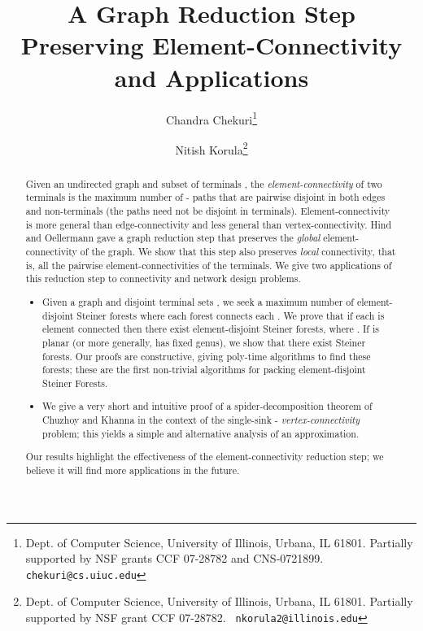 \documentclass[11pt]{article}
\title{A Graph Reduction Step Preserving Element-Connectivity \\ and Applications}
\author{
Chandra Chekuri\thanks{Dept. of Computer Science, University of Illinois, 
Urbana, IL 61801. Partially supported by NSF grants CCF 07-28782 and 
CNS-0721899. {\tt chekuri@cs.uiuc.edu}}
  \and 
Nitish Korula\thanks{Dept. of Computer Science, University of Illinois, Urbana,
    IL 61801. Partially supported by NSF grant CCF 07-28782. {\tt
      nkorula2@illinois.edu}} 
}
\begin{document}
\maketitle

\begin{abstract}
  Given an undirected graph  and subset of terminals , the {\em element-connectivity}  of two
  terminals  is the maximum number of - paths that
  are pairwise disjoint in both edges and non-terminals  (the paths need not be disjoint in terminals).
  Element-connectivity is more general than edge-connectivity and less
  general than vertex-connectivity. Hind and Oellermann \cite{hind}
  gave a graph reduction step that preserves the {\em global}
  element-connectivity of the graph.  We show that this step also
  preserves {\em local} connectivity, that is, all the pairwise
  element-connectivities of the terminals. We give two applications of
  this reduction step to connectivity and network design problems.
  \begin{itemize}
  \item Given a graph  and disjoint terminal sets , we seek a maximum number of element-disjoint
    Steiner forests where each forest connects each . We prove
    that if each  is  element connected then there exist
     element-disjoint Steiner
    forests, where . If  is planar (or more
    generally, has fixed genus), we show that there exist 
    Steiner forests. Our proofs are constructive, giving poly-time
    algorithms to find these forests; these are the first non-trivial
    algorithms for packing element-disjoint Steiner Forests.
  
  \item We give a very short and intuitive proof of a
    spider-decomposition theorem of Chuzhoy and Khanna
    \cite{ChuzhoyK08} in the context of the single-sink -{\em
      vertex-connectivity} problem; this yields a simple and
    alternative analysis of an  approximation.
  \end{itemize}
  Our results highlight the effectiveness of the element-connectivity
  reduction step; we believe it will find more applications in the future.
\end{abstract}
\end{document}
